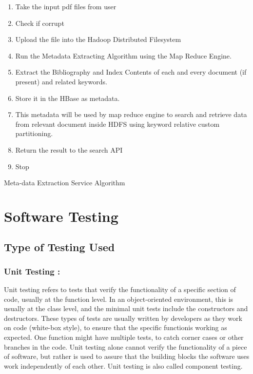 \documentclass[oneside,a4paper,12pt]{report}
\begin{document}
{\newpage

\begin{algorithm}[H]
\begin{enumerate}
\item Take the input pdf files from user
\item Check if corrupt
\item Upload the file into the Hadoop Distributed Filesystem
\item Run the Metadata Extracting Algorithm using the Map Reduce Engine.
\item Extract the Bibliography and Index Contents of each and every document (if present) and related keywords.
\item Store it in the HBase as metadata.
\item This metadata will be used by map reduce engine to search and retrieve data from relevant document inside HDFS using keyword relative custom partitioning.
\item Return the result to the search API
\item Stop
\end{enumerate}
 \caption{Meta-data Extraction Service Algorithm}
\end{algorithm}


\chapter{Software Testing}
\section{Type of Testing Used}

\subsection{Unit Testing : }
Unit testing refers to tests that verify the functionality of a specific section of code, usually at the function level. In an object-oriented environment, this is usually at the class level, and the minimal unit tests include the constructors and destructors. These types of tests are usually written by developers as they work on code (white-box style), to ensure that the specific functionis working as expected. One function might have multiple tests, to catch corner cases or other branches in the code. Unit testing alone cannot verify the functionality of a piece of software, but rather is used to assure that the building blocks the software uses work independently of each other. Unit testing is also called component testing.

}
\end{document}
